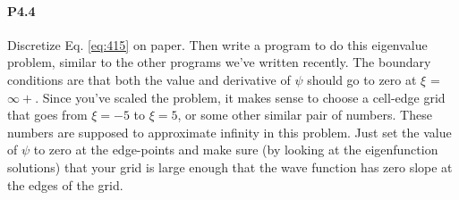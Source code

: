 \documentclass{book}
\theoremstyle{plain}
\theoremstyle{definition}
\numberwithin{exm}{chapter}
\theoremstyle{remark}
\theoremstyle{summary}
\theoremstyle{overview}
\begin{document}
\paragraph*{P4.4}
Discretize Eq. \eqref{eq:415} on paper. Then write a program to do this eigenvalue
problem, similar to the other programs we\rq ve written recently. The boundary conditions are that both the value and derivative of $\psi$ should go to zero
at $\xi$ = $\infty +$. Since you\rq ve scaled the problem, it makes sense to choose a
cell-edge grid that goes from $\xi =  - 5$ to $\xi  = 5$, or some other similar pair
of numbers. These numbers are supposed to approximate infinity in this
problem. Just set the value of $\psi$ to zero at the edge-points and make sure
(by looking at the eigenfunction solutions) that your grid is large enough
that the wave function has zero slope at the edges of the grid.
\end{document}

